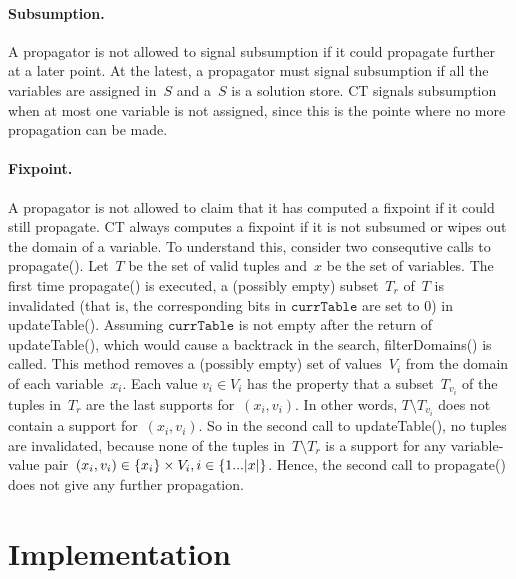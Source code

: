 \documentclass[a4paper,11pt]{article}
\newcommand{\CurrTable}{\texttt{currTable}}
\begin{document}
\paragraph{Subsumption.}
A propagator is not allowed to signal subsumption if it could propagate further
at a later point. At the latest, a propagator must signal subsumption if all the variables
are assigned in~$S$ and a~$S$ is a solution store.
CT signals subsumption when at most one variable is not assigned,
since this is the pointe where no more propagation can be made.

\paragraph{Fixpoint.}
A propagator is not allowed to claim that it has computed a fixpoint if
it could still propagate.
CT always computes a fixpoint if it is not subsumed or wipes out the domain of a variable.
To understand this, consider two consequtive calls to propagate().
Let~$T$ be the set of valid tuples and~$x$ be the set of variables.
The first time propagate() is executed, a (possibly empty) subset~$T_r$ of~$T$
is invalidated (that is, the corresponding bits in $\CurrTable$ are set to $0$)
in updateTable().
Assuming $\CurrTable$ is not empty after the return of updateTable(), which would
cause a backtrack in the search, filterDomains() is called.
This method removes a (possibly empty) set of values~$V_i$ from the domain 
of each variable~$x_i$.
Each value $v_i \in V_i$ has the property that a subset~$T_{v_i}$ 
of the tuples in~$T_r$ are the last supports for~$(x_i,v_i)$. In other words,
$T \setminus T_{v_i}$ does not contain a support for~$(x_i,v_i)$.
So in the second call to updateTable(), no tuples are invalidated,
because none of the tuples in~$T \setminus T_r$ is a support for any variable-value
pair~$(x_i, v_i) \in \left\{x_i\right\} \times V_i, i \in \left\{1...|x|\right\}$.
Hence, the second call to propagate() does not give
any further propagation.

\section{Implementation}
\label{implementation}

\end{document}
